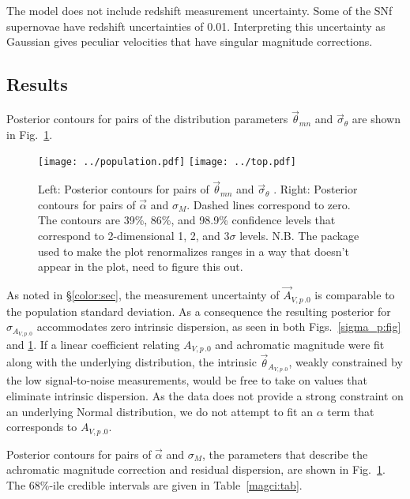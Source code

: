 \documentclass{aastex61}   	%
\begin{document}
The model does not include redshift measurement uncertainty.  Some of the SNf supernovae have redshift uncertainties of 0.01.  Interpreting
this uncertainty as Gaussian gives peculiar velocities that have singular magnitude corrections.

\subsection{Results}
\label{achromaticresults:sec}
Posterior contours for pairs of the distribution parameters
$\vec{\theta}_{\mathit{mn}}$ and
$\vec{\sigma}_{\theta}$ are shown in Fig.~\ref{confidence:fig}. 

\begin{figure}[htbp] %
   \centering
   \texttt{[image: ../population.pdf]}
   \texttt{[image: ../top.pdf]}
   \caption{Left: 
Posterior contours for pairs of
$\vec{\theta}_{\mathit{mn}}$ and
$\vec{\sigma}_{\theta}$ .  Right: Posterior contours for pairs of $\vec{\alpha}$ and
$\sigma_M$.  Dashed lines correspond to zero.
The contours are 39\%,  86\%, and 98.9\%   confidence levels that correspond to 2-dimensional 1, 2, and  3$\sigma$ levels.
N.B. The package used to make the plot renormalizes ranges in a way that doesn't appear in the plot, need
to figure  this out.
   \label{confidence:fig}}
\end{figure}

As noted in
\S\ref{color:sec}, the measurement uncertainty of ${\vec{A}_{V,p\,.0}}$ is comparable to the population standard deviation.  As a  consequence
the resulting
posterior for  $\sigma_{{A_{V,p\,.0}}}$  accommodates zero intrinsic dispersion, as
seen in both Figs.~\ref{sigma_p:fig} and \ref{confidence:fig}.  If 
a linear coefficient relating ${A_{V,p\,.0}}$
and achromatic magnitude were  fit along with the underlying distribution, the intrinsic  $\vec{\theta}_{A_{V,p\,.0}}$, weakly constrained by the 
low signal-to-noise measurements, would be
free to take on values that eliminate intrinsic dispersion.  As the data does not provide a strong constraint on an underlying Normal distribution,
we do not attempt to fit an $\alpha$ term that corresponds to  ${A_{V,p\,.0}}$.


Posterior contours for pairs  of $\vec{\alpha}$ and
$\sigma_M$, the parameters that describe the achromatic magnitude correction and residual dispersion, are shown in Fig.~\ref{confidence:fig}.
The 68\%-ile credible intervals are given in Table~\ref{magci:tab}.
\end{document}
